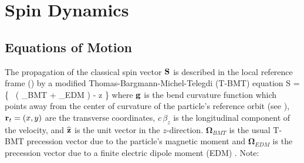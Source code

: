 \chapter{Spin Dynamics}
\label{c:spin}

\section{Equations of Motion}
\label{s:spin.dyn}

The propagation of the classical spin vector ${\bf S}$ is described in the local reference
frame () by a modified Thomas-Bargmann-Michel-Telegdi
(T-BMT) equation\cite{b:spin.hoff}
\Begineq
   \Bf S = 
  \left\{  \, 
  \left( {\pmb\Omega}_{BMT} + {\pmb\Omega}_{EDM} \right) - 
  \bfg \times \bfhat z \right\} \times {}
  \label{tbmt}
\Endeq
where ${\bf g}$ is the bend curvature function which points away from the center of curvature
of the particle's reference orbit (see ), ${\bf r}_t = (x, y)$ are the
transverse coordinates, $c \, \beta_z$ is the longitudinal component of the velocity, and
${\widehat{\bf z}}$ is the unit vector in the $z$-direction. $\pmb\Omega_{BMT}$ is the usual T-BMT
precession vector due to the particle's magnetic moment and $\pmb\Omega_{EDM}$ is the
precession vector due to a finite electric dipole moment (EDM) \cite{b:silenko}. Note:
